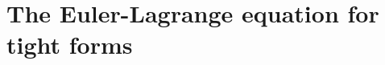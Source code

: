 \documentclass[reqno,11pt]{amsart}
\newcommand*\dif{\mathop{}\!\mathrm{d}}
\newtheorem{lemma}[theorem]{Lemma}
\theoremstyle{definition}
\numberwithin{equation}{section}
\newcommand\todo[1]{\textcolor{red}{TODO: #1}}
\begin{document}






\section{The Euler-Lagrange equation for tight forms}\label{infinityMax}
\end{document}
